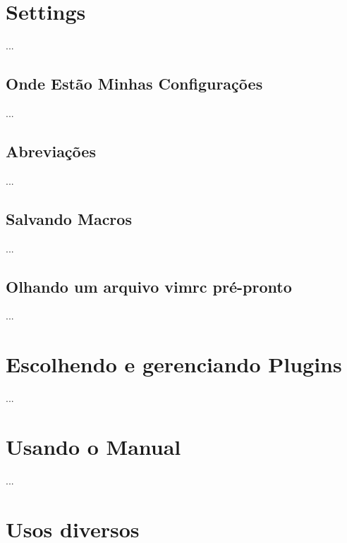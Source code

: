 \documentclass[a4paper, 12pt]{article}
\begin{document}





\newcommand{\vimcommand}[1]{%
    \sethlcolor{black}%
    \textbf{\textcolor{white}{\hl{#1}}}%
}
\newcommand{\vimkeys}[1]{%
    \sethlcolor{black}%
    \textbf{\textcolor{red}{\hl{#1}}}%
}









\section{Settings}
...
\subsection{Onde Estão Minhas Configurações}
...
\subsection{Abreviações}
...
\subsection{Salvando Macros}
...
\subsection{Olhando um arquivo vimrc pré-pronto}
...
\newpage
\section{Escolhendo e gerenciando Plugins}
...

\newpage
\section{Usando o Manual}
...

\newpage
\section{Usos diversos}
\end{document}
